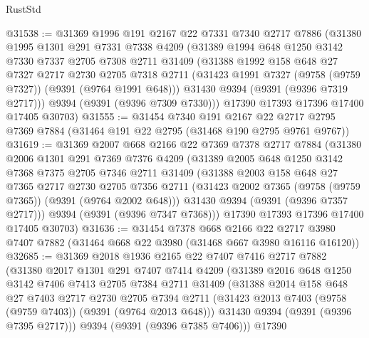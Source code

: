 \begin{lexlean}{RustStd}
\begin{coremodule}
@31538 := @31369
    @1996
    @191
    @2167
    @22
    @7331
    @7340
    @2717
    @7886
    (@31380
      @1995
      @1301
      @291
      @7331
      @7338
      @4209
      (@31389
        @1994
        @648
        @1250
        @3142
        @7330
        @7337
        @2705
        @7308
        @2711
        @31409
        (@31388
          @1992
          @158
          @648
          @27
          @7327
          @2717
          @2730
          @2705
          @7318
          @2711
          (@31423 @1991 @7327 (@9758 (@9759 @7327)) (@9391 (@9764 @1991 @648)))
          @31430
          @9394
          (@9391 (@9396 @7319 @2717)))
        @9394
        (@9391 (@9396 @7309 @7330)))
      @17390
      @17393
      @17396
      @17400
      @17405
      @30703)
@31555 := @31454
    @7340
    @191
    @2167
    @22
    @2717
    @2795
    @7369
    @7884
    (@31464 @191 @22 @2795 (@31468 @190 @2795 @9761 @9767))
@31619 := @31369
    @2007
    @668
    @2166
    @22
    @7369
    @7378
    @2717
    @7884
    (@31380
      @2006
      @1301
      @291
      @7369
      @7376
      @4209
      (@31389
        @2005
        @648
        @1250
        @3142
        @7368
        @7375
        @2705
        @7346
        @2711
        @31409
        (@31388
          @2003
          @158
          @648
          @27
          @7365
          @2717
          @2730
          @2705
          @7356
          @2711
          (@31423 @2002 @7365 (@9758 (@9759 @7365)) (@9391 (@9764 @2002 @648)))
          @31430
          @9394
          (@9391 (@9396 @7357 @2717)))
        @9394
        (@9391 (@9396 @7347 @7368)))
      @17390
      @17393
      @17396
      @17400
      @17405
      @30703)
@31636 := @31454
    @7378
    @668
    @2166
    @22
    @2717
    @3980
    @7407
    @7882
    (@31464 @668 @22 @3980 (@31468 @667 @3980 @16116 @16120))
@32685 := @31369
    @2018
    @1936
    @2165
    @22
    @7407
    @7416
    @2717
    @7882
    (@31380
      @2017
      @1301
      @291
      @7407
      @7414
      @4209
      (@31389
        @2016
        @648
        @1250
        @3142
        @7406
        @7413
        @2705
        @7384
        @2711
        @31409
        (@31388
          @2014
          @158
          @648
          @27
          @7403
          @2717
          @2730
          @2705
          @7394
          @2711
          (@31423 @2013 @7403 (@9758 (@9759 @7403)) (@9391 (@9764 @2013 @648)))
          @31430
          @9394
          (@9391 (@9396 @7395 @2717)))
        @9394
        (@9391 (@9396 @7385 @7406)))
      @17390

\end{coremodule}
\end{lexlean}
